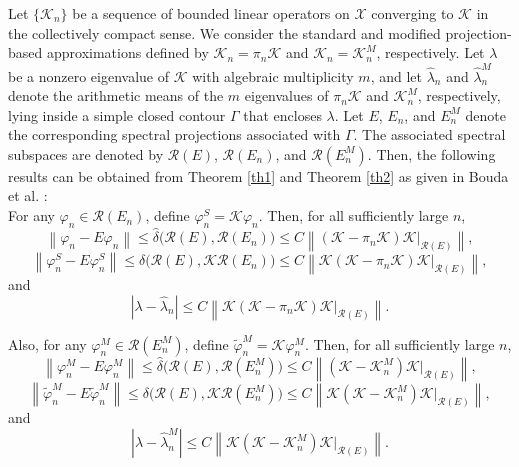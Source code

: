 \documentclass[pdflatex, sn-mathphys-num]{sn-jnl}%
\newcommand{\norm}[1]{\left\lVert #1\right\rVert}
\theoremstyle{thmstyleone}%
\theoremstyle{thmstyletwo}%
\theoremstyle{thmstylethree}%
\begin{document}
Let $\{\mathcal{K}_n\}$ be a sequence of bounded linear operators on $\mathcal{X}$ converging to $\mathcal{K}$ in the collectively compact sense. We consider the
standard and modified projection-based approximations defined by
$\mathcal{K}_n=\pi_n\mathcal{K}$ and $\mathcal{K}_n=\mathcal{K}_n^{M}$, respectively.
Let $\lambda$ be a nonzero eigenvalue of $\mathcal{K}$ with algebraic multiplicity $m$,
and let $\hat{\lambda}_n$ and $\hat{\lambda}_n^{M}$ denote the arithmetic means of the
$m$ eigenvalues of $\pi_n\mathcal{K}$ and $\mathcal{K}_n^{M}$, respectively, lying inside
a simple closed contour $\Gamma$ that encloses $\lambda$. Let $E$, $E_n$, and $E_n^{M}$ denote the corresponding spectral projections associated with $\Gamma$. The associated spectral subspaces are denoted by $\mathcal{R}(E)$, $\mathcal{R}(E_n)$, and
$\mathcal{R}(E_n^{M})$. Then, the following results can be obtained from Theorem \ref{th1} and Theorem \ref{th2} as given in Bouda et al. \cite{HB-CA-ZEA-KK}:\\
For any $\varphi_n \in \mathcal{R}(E_n)$, define $\varphi_n^{S} = \mathcal{K}\varphi_n$. Then, for all
sufficiently large $n$,
\begin{equation} \label{Eq: 0018}
	\norm{\varphi_n - E \varphi_n} \leq \hat{\delta} \big(\mathcal{R}(E), \mathcal{R}(E_n)\big) \leq C \norm{(\mathcal{K} - \pi_n \mathcal{K})\mathcal{K}|_{\mathcal{R}(E)}},
\end{equation}
\begin{equation} \label{Eq: 0019}
	\norm{\varphi_n^S - E \varphi_n^S} \leq \delta\big(\mathcal{R}(E), \mathcal{K} \mathcal{R}(E_n)\big) \leq C \norm{\mathcal{K}(\mathcal{K} - \pi_n \mathcal{K})\mathcal{K}|_{\mathcal{R}(E)}},
\end{equation}
and 
\begin{equation} \label{Eq: 0020}
	| \lambda - \hat{\lambda}_n | \leq C \norm{ \mathcal{K}(\mathcal{K} - \pi_n \mathcal{K})\mathcal{K}|_{\mathcal{R}(E)}}.
\end{equation}

\medskip
\noindent
Also, for any $\varphi_n^{M} \in \mathcal{R}(E_n^{M})$, define $\widetilde{\varphi}_n^{M} = \mathcal{K}\varphi_n^{M}$. Then, for all sufficiently large $n$, 
\begin{equation} \label{Eq: 0021}
	\norm{\varphi_n^M - E \varphi_n^M} \leq \hat{\delta} \big(\mathcal{R}(E), \mathcal{R}(E_n^M)\big) \leq C \norm{(\mathcal{K} - \mathcal{K}_n^M)\mathcal{K}|_{\mathcal{R}(E)}},
\end{equation}
\begin{equation} \label{Eq: 0022}
	\norm{\widetilde{\varphi}_n^M - E \widetilde{\varphi}_n^M} \leq \delta\big(\mathcal{R}(E), \mathcal{K} \mathcal{R}(E_n^M)\big) \leq C \norm{\mathcal{K}(\mathcal{K} - \mathcal{K}_n^M)\mathcal{K}|_{\mathcal{R}(E)}},
\end{equation}
and 
\begin{equation} \label{Eq: 0023}
	| \lambda - \hat{\lambda}_n^M | \leq C \norm{ \mathcal{K}(\mathcal{K} -  \mathcal{K}_n^M)\mathcal{K}|_{\mathcal{R}(E)}}.
\end{equation}
\end{document}
